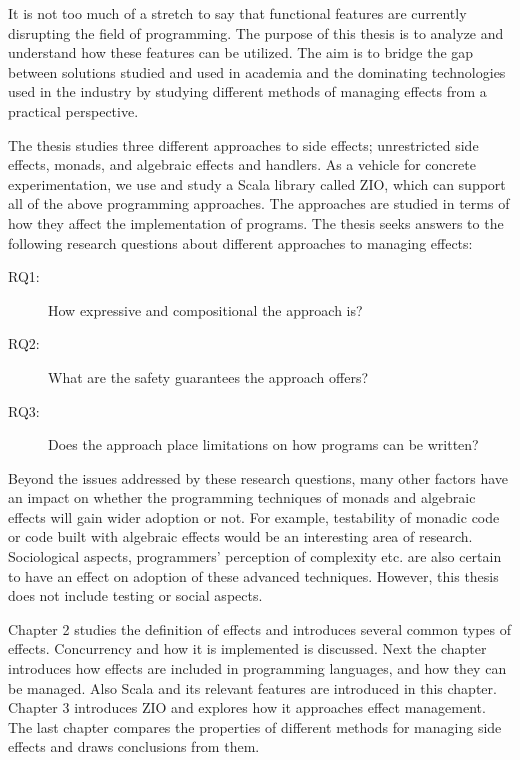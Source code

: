 It is not too much of a stretch to say that functional features are currently disrupting the field of programming. The purpose of this thesis is to analyze and understand how these features can be utilized. The aim is to bridge the gap between solutions studied and used in academia and the dominating technologies used in the industry by studying different methods of managing effects from a practical perspective.

The thesis studies three different approaches to side effects; unrestricted side effects, monads, and algebraic effects and handlers. As a vehicle for concrete experimentation, we use and study a Scala library called ZIO, which can support all of the above programming approaches. The approaches are studied in terms of how they affect the implementation of programs. The thesis seeks answers to the following research questions about different approaches to managing effects:
\begin{description}
    \item[RQ1:] How expressive and compositional the approach is?
    \item[RQ2:] What are the safety guarantees the approach offers?
    \item[RQ3:] Does the approach place limitations on how programs can be written?
\end{description}


Beyond the issues addressed by these research questions, many other factors have an impact on whether the programming techniques of monads and algebraic effects will gain wider adoption or not. For example, testability of monadic code or code built with algebraic effects would be an interesting area of research. 
Sociological aspects, programmers' perception of complexity etc. are also certain to have an effect on adoption of these advanced techniques. However, this thesis does not include testing or social aspects.

Chapter 2 studies the definition of effects and introduces several common types of effects. Concurrency and how it is implemented is discussed. Next the chapter introduces how effects are included in programming languages, and how they can be managed. Also Scala and its relevant features are introduced in this chapter. Chapter 3 introduces ZIO and explores how it approaches effect management.  The last chapter compares the properties of different methods for managing side effects and draws conclusions from them.

